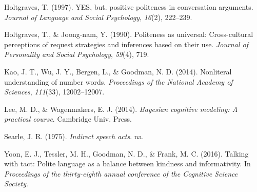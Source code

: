 \documentclass[10pt, letterpaper]{article}
\begin{document}
\hypertarget{ref-holtgraves1997}{}
Holtgraves, T. (1997). YES, but. positive politeness in conversation
arguments. \emph{Journal of Language and Social Psychology},
\emph{16}(2), 222--239.

\hypertarget{ref-holtgraves1990}{}
Holtgraves, T., \& Joong-nam, Y. (1990). Politeness as universal:
Cross-cultural perceptions of request strategies and inferences based on
their use. \emph{Journal of Personality and Social Psychology},
\emph{59}(4), 719.

\hypertarget{ref-Kao2014}{}
Kao, J. T., Wu, J. Y., Bergen, L., \& Goodman, N. D. (2014). Nonliteral
understanding of number words. \emph{Proceedings of the National Academy
of Sciences}, \emph{111}(33), 12002--12007.

\hypertarget{ref-LW2014}{}
Lee, M. D., \& Wagenmakers, E. J. (2014). \emph{Bayesian cognitive
modeling: A practical course}. Cambridge Univ. Press.

\hypertarget{ref-searle1975}{}
Searle, J. R. (1975). \emph{Indirect speech acts}. na.

\hypertarget{ref-yoon2016}{}
Yoon, E. J., Tessler, M. H., Goodman, N. D., \& Frank, M. C. (2016).
Talking with tact: Polite language as a balance between kindness and
informativity. In \emph{Proceedings of the thirty-eighth annual
conference of the Cognitive Science Society}.
\end{document}
